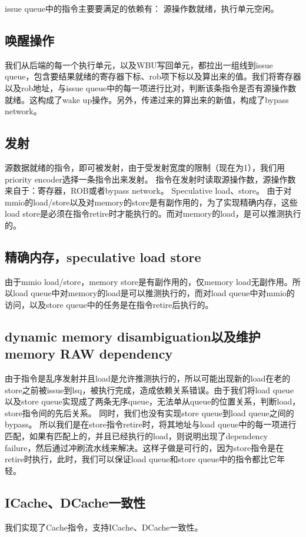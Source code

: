 \documentclass[lang=cn,11pt,a4paper]{elegantpaper}
\begin{document}
issue queue中的指令主要要满足的依赖有：
源操作数就绪，执行单元空闲。

\subsection{唤醒操作}
我们从后端的每一个执行单元，以及WBU写回单元，都拉出一组线到issue queue，包含要结果就绪的寄存器下标、rob项下标以及算出来的值。我们将寄存器以及rob地址，与issue queue中的每一项进行比对，判断该条指令是否有源操作数就绪。这构成了wake up操作。另外，传递过来的算出来的新值，构成了bypass network。

\subsection{发射}
源数据就绪的指令，即可被发射，由于受发射宽度的限制（现在为1），我们用priority encoder选择一条指令出来发射。
指令在发射时读取源操作数，源操作数来自于：寄存器，ROB或者bypass network。
Speculative load、store。
由于对mmio的load/store以及对memory的store是有副作用的，为了实现精确内存，这些load store是必须在指令retire时才能执行的。而对memory的load，是可以推测执行的。


\subsection{精确内存，speculative load store}
由于mmio load/store，memory store是有副作用的，仅memory load无副作用。所以load queue中对memory的load是可以推测执行的，而对load queue中对mmio的访问，以及store queue中的任务是在指令retire后执行的。


\subsection{dynamic memory disambiguation以及维护memory RAW dependency}
由于指令是乱序发射并且load是允许推测执行的，所以可能出现新的load在老的store之前被issue到lsq，被执行完成，造成依赖关系错误。由于我们将load queue以及store queue实现成了两条无序queue，无法单从queue的位置关系，判断load，store指令间的先后关系。
同时，我们也没有实现store queue到load queue之间的bypass。
所以我们是在store指令retire时，将其地址与load queue中的每一项进行匹配，如果有匹配上的，并且已经执行的load，则说明出现了dependency failure，然后通过冲刷流水线来解决。这样子做是可行的，因为store指令是在retire时执行，此时，我们可以保证load queue和store queue中的指令都比它年轻。

\subsection{ICache、DCache一致性}
我们实现了Cache指令，支持ICache、DCache一致性。
\end{document}
